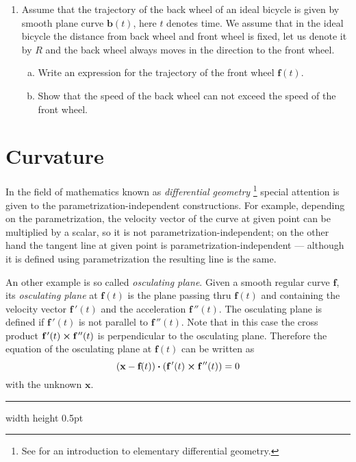 \begin{enumerate}[\bfseries 1.]
  \item Assume that the trajectory of the back wheel of an ideal bicycle is given by smooth plane curve $\textbf{b}(t)$, here $t$ denotes time. 
  We assume that in the ideal bicycle the distance from back wheel and front wheel is fixed, let us denote it by $R$ and the back wheel always moves in the direction to the front wheel.
  
  \begin{enumerate}[(a)]
  \item Write an expression for the trajectory of the front wheel $\textbf{f}(t)$. 
  \item Show that the speed of the back wheel can not exceed the speed of the front wheel.
  \end{enumerate}
\end{enumerate}

\newpage
\section{Curvature}

In the field of mathematics known as \emph{differential
geometry}%
\footnote{See \cite{one} for an introduction to elementary differential geometry.} 
 special attention is given to the parametrization-independent constructions.
For example, depending on the parametrization, the velocity vector of the curve at given point can be multiplied by a scalar, so it is not parametrization-independent;
on the other hand the tangent line at given point is parametrization-independent --- although it is defined using parametrization the resulting line is the same.

An other example is so called \emph{osculating plane}.
Given a smooth regular curve $\textbf{f}$,
its \emph{osculating plane} at $\textbf{f}(t)$
is the plane passing thru $\textbf{f}(t)$ and containing the velocity vector $\textbf{f}\,'(t)$ and the acceleration $\textbf{f}\,''(t)$.
The osculating plane is defined if $\textbf{f}\,'(t)$ is not parallel to $\textbf{f}\,''(t)$.
Note that in this case the cross product $\textbf{f}\,'(t) \bm{\times} \textbf{f}\,''(t)$ is perpendicular to the osculating plane.
Therefore the equation of the osculating plane at $\textbf{f}(t)$ can be written as
\[(\textbf{x}-\textbf{f}(t)) \bm{\cdot} (\textbf{f}\,'(t) \bm{\times} \textbf{f}\,''(t))=0\]
with the unknown $\textbf{x}$.

\vspace{3mm}
\hrule width \textwidth height 0.5pt


